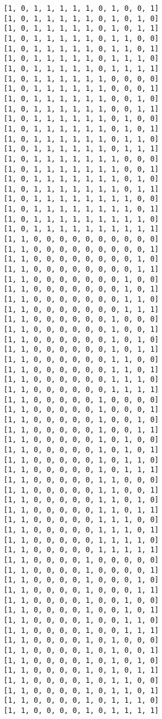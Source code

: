 \documentclass[11pt]{article}
\begin{document}
\begin{Verbatim}[commandchars=\\\{\}]
[1, 0, 1, 1, 1, 1, 1, 0, 1, 0, 0, 1]
[1, 0, 1, 1, 1, 1, 1, 0, 1, 0, 1, 0]
[1, 0, 1, 1, 1, 1, 1, 0, 1, 0, 1, 1]
[1, 0, 1, 1, 1, 1, 1, 0, 1, 1, 0, 0]
[1, 0, 1, 1, 1, 1, 1, 0, 1, 1, 0, 1]
[1, 0, 1, 1, 1, 1, 1, 0, 1, 1, 1, 0]
[1, 0, 1, 1, 1, 1, 1, 0, 1, 1, 1, 1]
[1, 0, 1, 1, 1, 1, 1, 1, 0, 0, 0, 0]
[1, 0, 1, 1, 1, 1, 1, 1, 0, 0, 0, 1]
[1, 0, 1, 1, 1, 1, 1, 1, 0, 0, 1, 0]
[1, 0, 1, 1, 1, 1, 1, 1, 0, 0, 1, 1]
[1, 0, 1, 1, 1, 1, 1, 1, 0, 1, 0, 0]
[1, 0, 1, 1, 1, 1, 1, 1, 0, 1, 0, 1]
[1, 0, 1, 1, 1, 1, 1, 1, 0, 1, 1, 0]
[1, 0, 1, 1, 1, 1, 1, 1, 0, 1, 1, 1]
[1, 0, 1, 1, 1, 1, 1, 1, 1, 0, 0, 0]
[1, 0, 1, 1, 1, 1, 1, 1, 1, 0, 0, 1]
[1, 0, 1, 1, 1, 1, 1, 1, 1, 0, 1, 0]
[1, 0, 1, 1, 1, 1, 1, 1, 1, 0, 1, 1]
[1, 0, 1, 1, 1, 1, 1, 1, 1, 1, 0, 0]
[1, 0, 1, 1, 1, 1, 1, 1, 1, 1, 0, 1]
[1, 0, 1, 1, 1, 1, 1, 1, 1, 1, 1, 0]
[1, 0, 1, 1, 1, 1, 1, 1, 1, 1, 1, 1]
[1, 1, 0, 0, 0, 0, 0, 0, 0, 0, 0, 0]
[1, 1, 0, 0, 0, 0, 0, 0, 0, 0, 0, 1]
[1, 1, 0, 0, 0, 0, 0, 0, 0, 0, 1, 0]
[1, 1, 0, 0, 0, 0, 0, 0, 0, 0, 1, 1]
[1, 1, 0, 0, 0, 0, 0, 0, 0, 1, 0, 0]
[1, 1, 0, 0, 0, 0, 0, 0, 0, 1, 0, 1]
[1, 1, 0, 0, 0, 0, 0, 0, 0, 1, 1, 0]
[1, 1, 0, 0, 0, 0, 0, 0, 0, 1, 1, 1]
[1, 1, 0, 0, 0, 0, 0, 0, 1, 0, 0, 0]
[1, 1, 0, 0, 0, 0, 0, 0, 1, 0, 0, 1]
[1, 1, 0, 0, 0, 0, 0, 0, 1, 0, 1, 0]
[1, 1, 0, 0, 0, 0, 0, 0, 1, 0, 1, 1]
[1, 1, 0, 0, 0, 0, 0, 0, 1, 1, 0, 0]
[1, 1, 0, 0, 0, 0, 0, 0, 1, 1, 0, 1]
[1, 1, 0, 0, 0, 0, 0, 0, 1, 1, 1, 0]
[1, 1, 0, 0, 0, 0, 0, 0, 1, 1, 1, 1]
[1, 1, 0, 0, 0, 0, 0, 1, 0, 0, 0, 0]
[1, 1, 0, 0, 0, 0, 0, 1, 0, 0, 0, 1]
[1, 1, 0, 0, 0, 0, 0, 1, 0, 0, 1, 0]
[1, 1, 0, 0, 0, 0, 0, 1, 0, 0, 1, 1]
[1, 1, 0, 0, 0, 0, 0, 1, 0, 1, 0, 0]
[1, 1, 0, 0, 0, 0, 0, 1, 0, 1, 0, 1]
[1, 1, 0, 0, 0, 0, 0, 1, 0, 1, 1, 0]
[1, 1, 0, 0, 0, 0, 0, 1, 0, 1, 1, 1]
[1, 1, 0, 0, 0, 0, 0, 1, 1, 0, 0, 0]
[1, 1, 0, 0, 0, 0, 0, 1, 1, 0, 0, 1]
[1, 1, 0, 0, 0, 0, 0, 1, 1, 0, 1, 0]
[1, 1, 0, 0, 0, 0, 0, 1, 1, 0, 1, 1]
[1, 1, 0, 0, 0, 0, 0, 1, 1, 1, 0, 0]
[1, 1, 0, 0, 0, 0, 0, 1, 1, 1, 0, 1]
[1, 1, 0, 0, 0, 0, 0, 1, 1, 1, 1, 0]
[1, 1, 0, 0, 0, 0, 0, 1, 1, 1, 1, 1]
[1, 1, 0, 0, 0, 0, 1, 0, 0, 0, 0, 0]
[1, 1, 0, 0, 0, 0, 1, 0, 0, 0, 0, 1]
[1, 1, 0, 0, 0, 0, 1, 0, 0, 0, 1, 0]
[1, 1, 0, 0, 0, 0, 1, 0, 0, 0, 1, 1]
[1, 1, 0, 0, 0, 0, 1, 0, 0, 1, 0, 0]
[1, 1, 0, 0, 0, 0, 1, 0, 0, 1, 0, 1]
[1, 1, 0, 0, 0, 0, 1, 0, 0, 1, 1, 0]
[1, 1, 0, 0, 0, 0, 1, 0, 0, 1, 1, 1]
[1, 1, 0, 0, 0, 0, 1, 0, 1, 0, 0, 0]
[1, 1, 0, 0, 0, 0, 1, 0, 1, 0, 0, 1]
[1, 1, 0, 0, 0, 0, 1, 0, 1, 0, 1, 0]
[1, 1, 0, 0, 0, 0, 1, 0, 1, 0, 1, 1]
[1, 1, 0, 0, 0, 0, 1, 0, 1, 1, 0, 0]
[1, 1, 0, 0, 0, 0, 1, 0, 1, 1, 0, 1]
[1, 1, 0, 0, 0, 0, 1, 0, 1, 1, 1, 0]
[1, 1, 0, 0, 0, 0, 1, 0, 1, 1, 1, 1]

\end{Verbatim}
\end{document}
